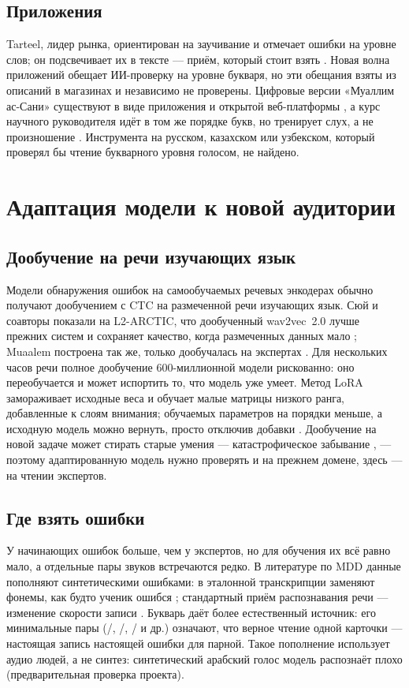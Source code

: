 \documentclass[a4paper,14pt]{extarticle}
\begin{document}
\subsection{Приложения}

Tarteel, лидер рынка, ориентирован на заучивание и отмечает ошибки на уровне слов; он подсвечивает их в
тексте --- приём, который стоит взять \cite{SRC-046}. Новая волна приложений обещает ИИ-проверку на
уровне букваря, но эти обещания взяты из описаний в магазинах и независимо не проверены. Цифровые версии
«Муаллим ас-Сани» существуют в виде приложения и открытой веб-платформы \cite{SRC-005,SRC-006}, а курс
научного руководителя идёт в том же порядке букв, но тренирует слух, а не произношение \cite{SRC-070}.
Инструмента на русском, казахском или узбекском, который проверял бы чтение букварного уровня голосом,
не найдено.

\section{Адаптация модели к новой аудитории}

\subsection{Дообучение на речи изучающих язык}

Модели обнаружения ошибок на самообучаемых речевых энкодерах обычно получают дообучением с CTC на
размеченной речи изучающих язык. Сюй и соавторы показали на L2-ARCTIC, что дообученный wav2vec~2.0 лучше
прежних систем и сохраняет качество, когда размеченных данных мало \cite{SRC-116}; Muaalem построена так
же, только дообучалась на экспертах \cite{SRC-002}. Для нескольких часов речи полное дообучение
600-миллионной модели рискованно: оно переобучается и может испортить то, что модель уже умеет. Метод
LoRA замораживает исходные веса и обучает малые матрицы низкого ранга, добавленные к слоям внимания;
обучаемых параметров на порядки меньше, а исходную модель можно вернуть, просто отключив добавки
\cite{SRC-111}. Дообучение на новой задаче может стирать старые умения --- катастрофическое забывание
\cite{SRC-118}, --- поэтому адаптированную модель нужно проверять и на прежнем домене, здесь --- на чтении
экспертов.

\subsection{Где взять ошибки}

У начинающих ошибок больше, чем у экспертов, но для обучения их всё равно мало, а отдельные пары звуков
встречаются редко. В литературе по MDD данные пополняют синтетическими ошибками: в эталонной
транскрипции заменяют фонемы, как будто ученик ошибся \cite{SRC-119}; стандартный приём распознавания
речи --- изменение скорости записи \cite{SRC-120}. Букварь даёт более естественный источник: его
минимальные пары (/, /, / и др.) означают, что верное чтение одной
карточки --- настоящая запись настоящей ошибки для парной. Такое пополнение использует аудио людей, а не
синтез: синтетический арабский голос модель распознаёт плохо (предварительная проверка проекта).
\end{document}
